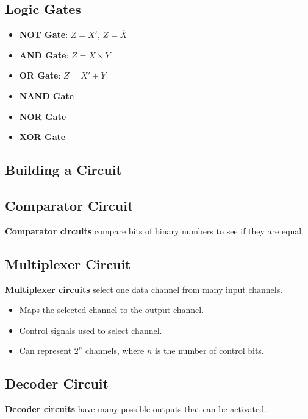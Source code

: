 \documentclass[12pt, letterpaper]{article}
\begin{document}
\subsection*{Logic Gates}

\begin{itemize}
  \item \textbf{NOT Gate}: $ Z = X' $, $ Z = \overline{X} $
  \item \textbf{AND Gate}: $ Z = X \times Y $
  \item \textbf{OR Gate}: $ Z = X' + Y $
  \item \textbf{NAND Gate} %
  \item \textbf{NOR Gate}
  \item \textbf{XOR Gate}
\end{itemize}

\subsection*{Building a Circuit}


\subsection*{Comparator Circuit}

\textbf{Comparator circuits} compare bits of binary numbers to see if
they are equal.

\subsection*{Multiplexer Circuit}

\textbf{Multiplexer circuits} select one data channel from many
input channels.

\begin{itemize}
  \item Maps the selected channel to the output channel.
  \item Control signals used to select channel.
  \item Can represent $ 2^n $ channels, where $ n $ is the number of
    control bits.
\end{itemize}

\subsection*{Decoder Circuit}

\textbf{Decoder circuits} have many possible outputs that can be activated.
\end{document}
